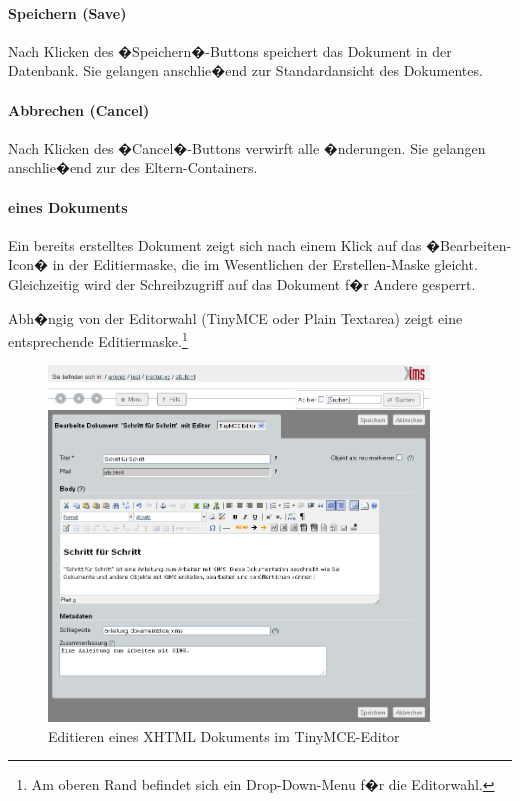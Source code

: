 \paragraph{Speichern (Save)}
\label{save}

Nach Klicken des �Speichern�-Buttons speichert  das
Dokument in der Datenbank. Sie gelangen anschlie�end zur
Standardansicht des Dokumentes.

\paragraph{Abbrechen (Cancel)}
\label{cancel}

Nach Klicken des �Cancel�-Buttons verwirft  alle
�nderungen. Sie gelangen anschlie�end zur 
des Eltern-Containers.


\paragraph{ eines Dokuments}
\label{edit}

Ein bereits erstelltes Dokument zeigt sich nach einem Klick auf das
�Bearbeiten-Icon� in der Editiermaske, die im Wesentlichen der
Erstellen-Maske gleicht. Gleichzeitig wird der Schreibzugriff auf das
Dokument f�r Andere gesperrt.

Abh�ngig von der Editorwahl (TinyMCE oder Plain Textarea)
zeigt  eine entsprechende Editiermaske.\footnote{Am
  oberen Rand befindet sich ein Drop-Down-Menu f�r die Editorwahl.}

\begin{figure}[!ht]
  \centering
  \includegraphics[width=0.9\textwidth]{./images/editdoktiny.png}
  \caption{Editieren eines XHTML Dokuments im TinyMCE-Editor}
  \label{fig:xhtmlintinymce}
\end{figure}


